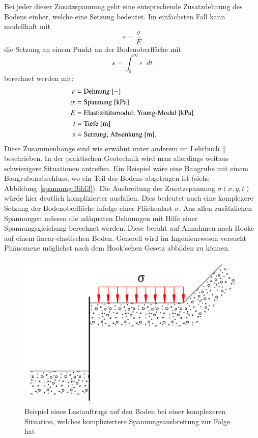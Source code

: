 Bei jeder dieser Zusatzspannung geht eine entsprechende Zusatzdehnung des Bodens einher, welche eine Setzung bedeutet.
Im einfachsten Fall kann modellhaft mit
\[
\varepsilon
=
\frac{\sigma}{E}
\]
die Setzung an einem Punkt an der Bodenoberfläche mit
\[
s
=
\int_{0}^{\infty}\varepsilon\enspace dt
\]
berechnet werden mit:
\begin{align*}
	\varepsilon &= \text{Dehnung [$-$]}                                     \\
	     \sigma &= \text{Spannung [\si{\kilo\pascal}]}                      \\
	          E &= \text{Elastizitätsmodul; Young-Modul [\si{\kilo\pascal}]}\\
	          t &= \text{Tiefe [\si{\meter}]}                               \\
	          s &= \text{Setzung, Absenkung [m].}
\end{align*}
Diese Zusammenhänge sind wie erwähnt unter anderem im  Lehrbuch [\cite{spannung:Grundlagen-der-Geotechnik}] beschrieben.
In der praktischen Geotechnik wird man allerdings weitaus schwierigere Situationen antreffen.
Ein Beispiel wäre eine Baugrube mit einem Baugrubenabschluss, wo ein Teil des Bodens abgetragen ist (siehe Abbildung~\ref{spannung:Bild3}).
Die Ausbreitung der Zusatzspannung $\sigma(x,y,t)$ würde hier deutlich komplizierter ausfallen.
Dies bedeutet auch eine komplexere Setzung der Bodenoberfläche infolge einer Flächenlast $\sigma$.
Aus allen zusätzlichen Spannungen müssen die adäquaten Dehnungen mit Hilfe einer Spannungsgleichung berechnet werden.
Diese beruht auf Annahmen nach Hooke auf einem linear-elastischen Boden.
Generell wird im Ingenieurwesen versucht Phänomene möglichst nach dem Hook'schen Gesetz abbilden zu können.

\begin{figure}
	\centering
	\includegraphics[width=0.45\linewidth,keepaspectratio]{papers/spannung/Grafiken/Bild3.png}
	\caption{Beispiel eines Lastauftrags auf den Boden bei einer komplexeren Situation, welches kompliziertere Spannungsausbreitung zur Folge hat}
	\label{fig:Bild3}
\end{figure}
